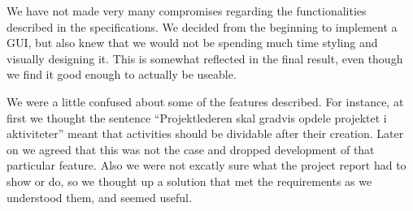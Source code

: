 We have not made very many compromises regarding the functionalities described in the specifications. We decided from the beginning to implement a GUI, but also knew that we would not be spending much time styling and visually designing it. This is somewhat reflected in the final result, even though we find it good enough to actually be useable.

We were a little confused about some of the features described. For instance, at first we thought the sentence ``Projektlederen skal gradvis opdele projektet i aktiviteter'' meant that activities should be dividable after their creation. Later on we agreed that this was not the case and dropped development of that particular feature. Also we were not excatly sure what the project report had to show or do, so we thought up a solution that met the requirements as we understood them, and seemed useful.
